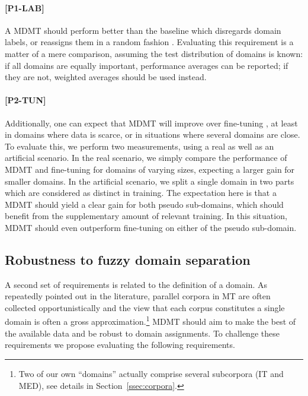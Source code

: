 \documentclass[11pt,a4paper]{article}
\newcommand{\fyDone}[1]{\done[FY]\Todo[FY:]{\textcolor{orange}{#1}}}
\newcommand{\fyFuture}[1]{\done[FY]\Todo[FY:]{\textcolor{red}{#1}}}
\newcommand{\jcDone}[1]{\done[JC]\Todo[JC:]{\textcolor{red}{#1}}}
\begin{document}
\paragraph{[P1-LAB]}\fyDone{Decide naming scheme}A MDMT should perform better than the baseline which disregards domain labels, or reassigns them in a random fashion \cite{Joshi12multidomain}. Evaluating this requirement is a matter of a mere comparison, assuming the test distribution of domains is known: if all domains are equally important, performance averages can be reported; if they are not, weighted averages should be used instead.\fyFuture{Try random label assignments ?} %

\paragraph{[P2-TUN]} Additionally, one can expect that MDMT will improve over fine-tuning \cite{Luong15stanford,Freitag16fast}, at least in domains where data is scarce, or in situations where several domains are close. To evaluate this, we perform two measurements, using a real as well as an artificial scenario. In the real scenario, we simply compare the performance of MDMT and fine-tuning for domains of varying sizes, expecting a larger gain for smaller domains. In the artificial scenario, we split a single domain in two parts which are considered as distinct in training. The expectation here is that a MDMT should yield a clear gain for both pseudo sub-domains, which should benefit from the supplementary amount of relevant training. In this situation, MDMT should even outperform fine-tuning on either of the pseudo sub-domain.
\jcDone{I dont understand the prediction... why running MDMT on 2 artificial subdomains should show  gains over fine-tunning?}\fyDone{small loss with respect to non split ?}

\subsection{Robustness to fuzzy domain separation \label{ssec:robusness}}
A second set of requirements is related to the definition of a domain. As repeatedly pointed out in the literature, parallel corpora in MT are often collected opportunistically and the view that each corpus constitutes a single domain is often a gross approximation.\footnote{Two of our own ``domains'' actually comprise several subcorpora (IT and MED), see details in Section~\ref{ssec:corpora}.} MDMT should aim to make the best of the available data and be robust to domain assignments. To challenge these requirements we propose evaluating the following requirements.
\end{document}
